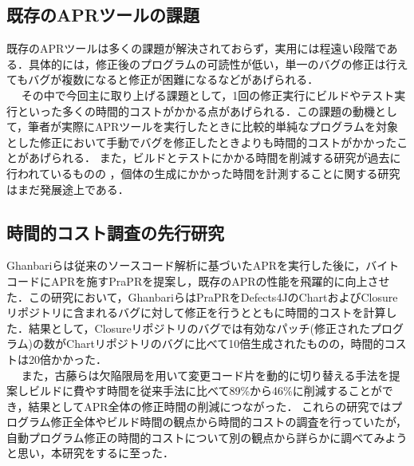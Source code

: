 \documentclass[uplatex,dvipdfmx,a4paper]{jsarticle}
\let\oldcite\cite
\renewcommand{\cite}[1]{\xspace\oldcite{#1}}
\begin{document}
\subsection{既存のAPRツールの課題} \label{sec:prev_challenge}
既存のAPRツールは多くの課題が解決されておらず\cite{le2013current}，実用には程遠い段階である．具体的には，修正後のプログラムの可読性が低い\cite{smith2015cure}，単一のバグの修正は行えてもバグが複数になると修正が困難になる\cite{saha2019harnessing}などがあげられる．\\　
その中で今回主に取り上げる課題として，1回の修正実行にビルドやテスト実行といった多くの時間的コストがかかる点\cite{chen2017contract}があげられる．この課題の動機として，筆者が実際にAPRツールを実行したときに比較的単純なプログラムを対象とした修正において手動でバグを修正したときよりも時間的コストがかかったことがあげられる．
また，ビルドとテストにかかる時間を削減する研究が過去に行われているものの\cite{id692}
，個体の生成にかかった時間を計測することに関する研究はまだ発展途上である．
\subsection{時間的コスト調査の先行研究}
Ghanbari\cite{ghanbari2019practical}らは従来のソースコード解析に基づいたAPRを実行した後に，バイトコードにAPRを施すPraPRを提案し，既存のAPRの性能を飛躍的に向上させた．この研究において，GhanbariらはPraPRをDefects4JのChartおよびClosureリポジトリに含まれるバグに対して修正を行うとともに時間的コストを計算した．結果として，Closureリポジトリのバグでは有効なパッチ(修正されたプログラム)の数がChartリポジトリのバグに比べて10倍生成されたものの，時間的コストは20倍かかった．\\　
また，古藤\cite{id692}らは欠陥限局を用いて変更コード片を動的に切り替える手法を提案しビルドに費やす時間を従来手法に比べて89\%から46\%に削減することができ，結果としてAPR全体の修正時間の削減につながった．
これらの研究ではプログラム修正全体やビルド時間の観点から時間的コストの調査を行っていたが，自動プログラム修正の時間的コストについて別の観点から詳らかに調べてみようと思い，本研究をするに至った．
\clearpage
\end{document}
